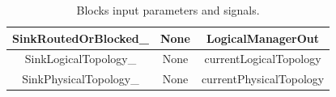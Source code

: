 \begin{table}[H]
\begin{tabular}{|c|c|c|}
		SinkRoutedOrBlocked\_       & None                                                                                                          & LogicalManagerOut                                                                                 \\ \hline
		SinkLogicalTopology\_       & None                                                                                                          & currentLogicalTopology                                                                            \\ \hline
		SinkPhysicalTopology\_      & None                                                                                                          & currentPhysicalTopology                                                                           \\ \hline
	\end{tabular}
	\caption{Blocks input parameters and signals.}
	\label{blocks_input}
\end{table}


